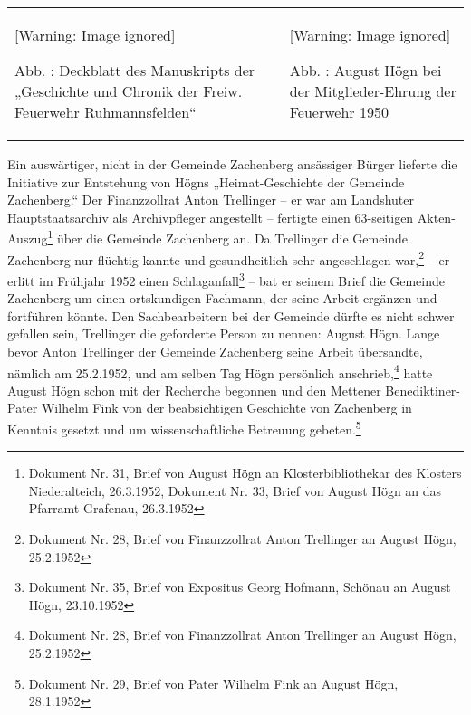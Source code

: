 \documentclass[a4paper]{article}
\newcounter{Abb}
\renewcommand\theAbb{\arabic{Abb}}
\begin{document}
\begin{center}
\begin{minipage}{10.007cm}
\begin{flushleft}
\tablefirsthead{}
\tablehead{}
\tabletail{}
\tablelasttail{}
\begin{supertabular}{m{5.0280004cm}m{4.578cm}}
  [Warning: Image ignored] %
 
Abb. \stepcounter{Abb}{\theAbb}: Deckblatt des Manuskripts der
„Geschichte und Chronik der Freiw. Feuerwehr Ruhmannsfelden“ &
  [Warning: Image ignored] %
 
Abb. \stepcounter{Abb}{\theAbb}: August Högn bei der Mitglieder-Ehrung
der Feuerwehr 1950\\
\end{supertabular}
\end{flushleft}
\end{minipage}
\end{center}
Ein auswärtiger, nicht in der Gemeinde Zachenberg ansässiger Bürger
lieferte die Initiative zur Entstehung von Högns „Heimat-Geschichte der
Gemeinde Zachenberg.“ Der Finanzzollrat Anton Trellinger – er war am
Landshuter Hauptstaatsarchiv als Archivpfleger angestellt – fertigte
einen 63-seitigen Akten-Auszug\footnote{ Dokument Nr. 31, Brief von
August Högn an Klosterbibliothekar des Klosters Niederalteich,
26.3.1952, Dokument Nr. 33, Brief von August Högn an das Pfarramt
Grafenau, 26.3.1952} über die Gemeinde Zachenberg an. Da Trellinger die
Gemeinde Zachenberg nur flüchtig kannte und gesundheitlich sehr
angeschlagen war,\footnote{ Dokument Nr. 28, Brief von Finanzzollrat
Anton Trellinger an August Högn, 25.2.1952} – er erlitt im Frühjahr
1952 einen Schlaganfall\footnote{ Dokument Nr. 35, Brief von Expositus
Georg Hofmann, Schönau an August Högn, 23.10.1952} – bat er seinem
Brief die Gemeinde Zachenberg um einen ortskundigen Fachmann, der seine
Arbeit ergänzen und fortführen könnte. Den Sachbearbeitern bei der
Gemeinde dürfte es nicht schwer gefallen sein, Trellinger die
geforderte Person zu nennen: August Högn. Lange bevor Anton Trellinger
der Gemeinde Zachenberg seine Arbeit übersandte, nämlich am 25.2.1952,
und am selben Tag Högn persönlich anschrieb,\footnote{ Dokument Nr. 28,
Brief von Finanzzollrat Anton Trellinger an August Högn, 25.2.1952}
hatte August Högn schon mit der Recherche begonnen und den Mettener
Benediktiner-Pater Wilhelm Fink von der beabsichtigen Geschichte von
Zachenberg in Kenntnis gesetzt und um wissenschaftliche Betreuung
gebeten.\footnote{ Dokument Nr. 29, Brief von Pater Wilhelm Fink an
August Högn, 28.1.1952} 
\end{document}
